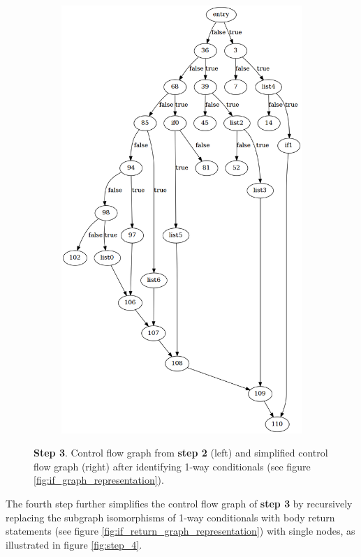 \begin{figure}[htbp]
\begin{subfigure}[t]{0.45\textwidth}
		\includegraphics[width=\textwidth]{appendices/stmt_example/stmt_3.png}
	\end{subfigure}
	\caption{\textbf{Step 3}. Control flow graph from \textbf{step 2} (left) and simplified control flow graph (right) after identifying 1-way conditionals (see figure \ref{fig:if_graph_representation}).}
	\label{fig:step_3}
\end{figure}

The fourth step further simplifies the control flow graph of \textbf{step 3} by recursively replacing the subgraph isomorphisms of 1-way conditionals with body return statements (see figure \ref{fig:if_return_graph_representation}) with single nodes, as illustrated in figure \ref{fig:step_4}.

